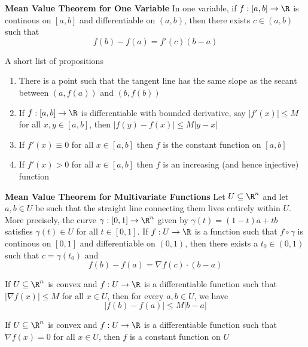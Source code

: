 \documentclass[11pt]{article}
\begin{document}
\begin{theorem*}
  \label{One variable Mean Value Theorem}
  \textbf{Mean Value Theorem for One Variable}
  In one variable, if $f: [a,b]\rightarrow \R$ is continous on $[a,b]$ and differentiable on $(a,b)$, then there exists $c\in (a,b)$ such that
  \[
    f(b) - f(a) = f'(c)(b-a)
  \]
  \begin{corollary*}
    A short list of propositions \\
    \begin{enumerate}
      \item There is a point such that the tangent line has the same slope as the secant between $(a, f(a))$ and $(b, f(b))$
      \item If $f: [a,b]\rightarrow \R$ is differentiable with bounded derivative, say $|f'(x)| \leq M$ for all $x,y\in [a,b]$, then $|f(y) - f(x)| \leq M |y-x|$
      \item If $f'(x) \equiv 0$ for all $x\in[a,b]$ then $f$ is the constant function on $[a,b]$
      \item If $f'(x) > 0$ for all $x\in[a,b]$ then $f$ is an increasing (and hence injective) function
    \end{enumerate}
  \end{corollary*}
\end{theorem*}


\begin{theorem*}
  \label{multivariate Mean Value Theorem}
  \textbf{Mean Value Theorem for Multivariate Functions}
  Let $U\subseteq \R^n$ and let $a,b\in U$ be such that the straight line connecting them lives entirely within $U$. More precisely, the curve $\gamma: [0,1]\rightarrow \R^n$ given by $\gamma(t) = (1-t)a + tb$ satisfies $\gamma(t)\in U$ for all $t\in [0,1]$. If $f: U\rightarrow \R$ is a function such that $f\circ \gamma$ is continous on $[0,1]$ and differentiable on $(0,1)$, then there exists a $t_0\in (0,1)$ such that $c=\gamma(t_0)$ and
  \[
    f(b) - f(a) = \nabla f(c) \cdot (b-a)
  \]
  \begin{corollary*}
    If $U\subseteq \R^n$ is convex and $f:U\rightarrow \R$ is a differentiable function such that $|\nabla f(x)| \leq M$ for all $x\in U$, then for every $a,b\in U$, we have
    \[
      |f(b) - f(a)| \leq M |b-a|
    \]
  \end{corollary*}

  \begin{corollary*}
    If $U\subseteq \R^n$ is convex and $f: U\rightarrow \R$ is a differentiable function such that $\nabla f(x) = 0$ for all $x\in U$, then $f$ is a constant function on $U$
  \end{corollary*}
\end{theorem*}
\end{document}
